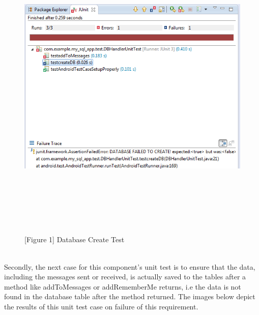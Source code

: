 \documentclass[29pt,a4paper]{moderncv}
\begin{document}
	\begin{figure}
				\\ \centering
				\\ \includegraphics[width=6.0in, height=5.0in]{./databasecreate.png}
				
				\\\caption{[Figure 1] Database Create Test}
	\end{figure}\\
\newpage	
	Secondly, the next case for this component’s unit test is to ensure that the data, including the messages sent or received, is actually saved to the tables after a method like addToMessages or addRememberMe returns, i.e the data is not found in the database table after the method returned. The images below depict the results of this unit test case on failure of this requirement.\\
	
\end{document}
